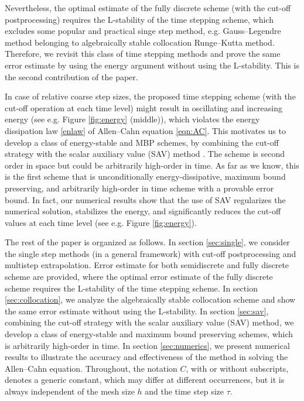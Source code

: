 \documentclass[10pt,final,leqno,onefignum,onetabnum]{siamltex}%
\begin{document}
Nevertheless, the optimal estimate of the fully discrete scheme (with the cut-off postprocessing) requires the L-stability of the time stepping scheme,
which excludes some popular and practical singe step method, e.g. Gauss--Legendre method belonging to algebraically stable collocation Runge--Kutta method.
Therefore, we revisit this class of time stepping methods and prove the same error estimate
by using the energy argument without using the L-stability. This is the second contribution of the paper.

In case of relative coarse step sizes, the proposed time stepping scheme (with the cut-off operation at each time level)
might result in oscillating and increasing energy (see e.g. Figure \ref{fig:energy} (middle)),
which violates the energy dissipation law \eqref{enlaw} of Allen--Cahn equation  \eqref{eqn:AC}. This motivates us to
develop a class of energy-stable and MBP schemes,
by combining the cut-off strategy with the scalar auxiliary value (SAV) method \cite{shen2019new}.
The scheme is second order in space but could be arbitrarily high-order in time. As far as we know, this is the first scheme that is unconditionally
 energy-dissipative, maximum bound preserving, and
arbitrarily high-order in time scheme with a provable error bound.
In fact, our numerical results show that the use of SAV regularizes the numerical solution, stabilizes the energy,
and significantly reduces the cut-off values at each time level (see e.g. Figure \ref{fig:energy}).

The rest of the paper is organized as follows. In section \ref{sec:single}, we consider the single step methods (in a general framework)
with cut-off postprocessing and multistep extrapolation. Error estimate for both semidiscrete and fully discrete scheme are provided,
where the optimal error estimate of the fully discrete scheme requires the L-stability of the time stepping scheme.
In section \ref{sec:collocation}, we analyze the algebraically stable collocation scheme and show the same error estimate without using the L-stability.
In section \ref{sec:sav}, combining the cut-off strategy with the scalar auxiliary value (SAV) method,
we develop a class of energy-stable and maximum bound preserving schemes, which is arbitrarily high-order in time.
In section \ref{sec:numerics}, we present numerical results to illustrate the
accuracy and effectiveness of the method in solving the Allen--Cahn equation.
Throughout, the notation $C$, with or without subscripts, denotes a generic constant, which may differ at different occurrences,
but it is always independent of the mesh size $h$ and the time step size $\tau$.
\end{document}
